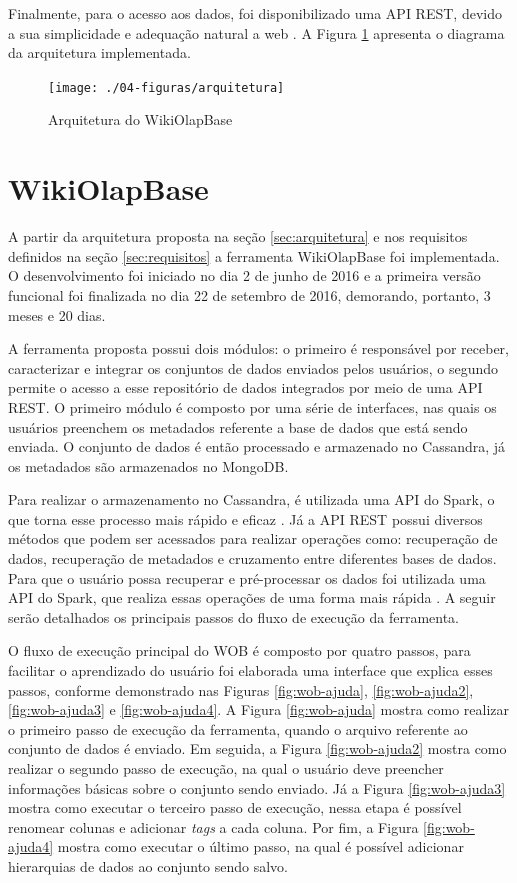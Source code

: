 Finalmente, para o acesso aos dados, foi disponibilizado uma API REST, devido a sua 
simplicidade e adequação natural a web \cite{maleshkova2010}. A Figura \ref{fig:arquitetura} apresenta o 
diagrama da arquitetura implementada.  

\begin{figure}[!htb]
    \centering
    \caption{Arquitetura do WikiOlapBase}
    \texttt{[image: ./04-figuras/arquitetura]}
    \label{fig:arquitetura}
\end{figure}

\section{WikiOlapBase}
\label{sec:wob}

A partir da arquitetura proposta na seção \ref{sec:arquitetura} e nos requisitos definidos
na seção \ref{sec:requisitos} a ferramenta WikiOlapBase foi implementada. O desenvolvimento 
foi iniciado no dia 2 de junho de 2016 e a primeira versão funcional foi finalizada no dia 
22 de setembro de 2016, demorando, portanto, 3 meses e 20 dias.

A ferramenta proposta possui dois módulos: o primeiro é responsável por receber, caracterizar
e integrar os conjuntos de dados enviados pelos usuários, o segundo permite o acesso a esse 
repositório de dados integrados por meio de uma API REST. O primeiro módulo é composto por 
uma série de interfaces, nas quais os usuários preenchem os metadados referente a base de 
dados que está sendo enviada. O conjunto de dados é então processado e armazenado no 
Cassandra, já os metadados são armazenados no MongoDB. 

Para realizar o armazenamento no Cassandra, é utilizada uma API do Spark, o que torna esse 
processo mais rápido e eficaz \cite{kolaczkowski2014}. Já a API REST possui diversos métodos 
que podem ser acessados para realizar operações como: recuperação de dados, recuperação de 
metadados e cruzamento entre diferentes bases de dados. Para que o usuário possa recuperar 
e pré-processar os dados foi utilizada uma API do Spark, que realiza essas operações de uma 
forma mais rápida \cite{kolaczkowski2014}. A seguir serão detalhados os principais passos 
do fluxo de execução da ferramenta.

O fluxo de execução principal do WOB é composto por quatro passos, para facilitar o 
aprendizado do usuário foi elaborada uma interface que explica esses passos, conforme
demonstrado nas Figuras \ref{fig:wob-ajuda}, \ref{fig:wob-ajuda2}, \ref{fig:wob-ajuda3} e
\ref{fig:wob-ajuda4}. A Figura \ref{fig:wob-ajuda} mostra como realizar o primeiro passo de execução 
da ferramenta, quando o arquivo referente ao conjunto de dados é enviado. Em seguida, a 
Figura \ref{fig:wob-ajuda2} mostra como realizar o segundo passo de execução, na qual o
usuário deve preencher informações básicas sobre o conjunto sendo enviado. Já a Figura \ref{fig:wob-ajuda3} 
mostra como executar o terceiro passo de execução, nessa etapa é possível renomear colunas e 
adicionar \textit{tags} a cada coluna. Por fim, a Figura \ref{fig:wob-ajuda4} mostra como 
executar o último passo, na qual é possível adicionar hierarquias de dados ao
conjunto sendo salvo.

